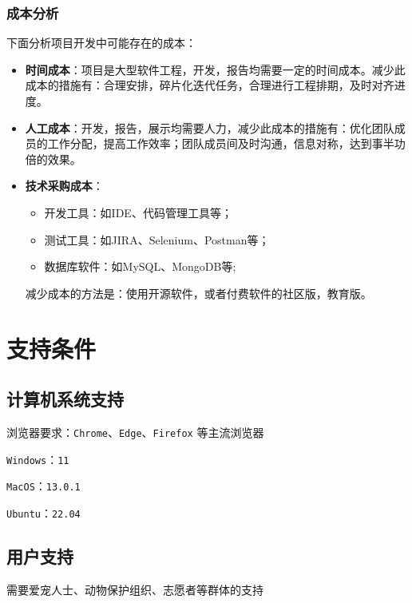 \documentclass[12pt,a4paper,UTF8]{article}
\begin{document}
\subsubsection{成本分析}
下面分析项目开发中可能存在的成本：
\begin{itemize}
  \item \textbf{时间成本}：项目是大型软件工程，开发，报告均需要一定的时间成本。减少此成本的措施有：合理安排，碎片化迭代任务，合理进行工程排期，及时对齐进度。
  \item \textbf{人工成本}：开发，报告，展示均需要人力，减少此成本的措施有：优化团队成员的工作分配，提高工作效率；团队成员间及时沟通，信息对称，达到事半功倍的效果。
  \item \textbf{技术采购成本}：
  \begin{itemize}
    \item 开发工具：如IDE、代码管理工具等；
    \item 测试工具：如JIRA、Selenium、Postman等；
    \item 数据库软件：如MySQL、MongoDB等;
  \end{itemize}
  减少成本的方法是：使用开源软件，或者付费软件的社区版，教育版。
\end{itemize}

\section{支持条件}

\subsection{计算机系统支持}
浏览器要求：\verb|Chrome|、\verb|Edge|、\verb|Firefox| 等主流浏览器

\verb|Windows|：\verb|11|

\verb|MacOS|：\verb|13.0.1|

\verb|Ubuntu|：\verb|22.04|

\subsection{用户支持}
需要爱宠人士、动物保护组织、志愿者等群体的支持
\end{document}
